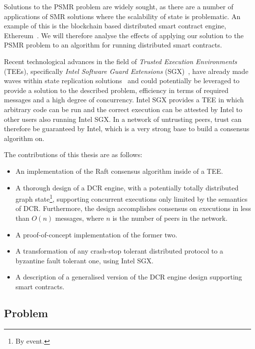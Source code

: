 \documentclass{article}
\begin{document}
	Solutions to the PSMR problem are widely sought, as there are a number of applications of SMR solutions where the scalability of state is problematic.
	An example of this is the blockchain based distributed smart contract engine, Ethereum~\cite{_ethereum_2018}.
	We will therefore analyse the effects of applying our solution to the PSMR problem to an algorithm for running distributed smart contracts.

	Recent technological advances in the field of \textit{Trusted Execution Environments} (TEEs), specifically \textit{Intel Software Guard Extensions} (SGX)~\cite{costan_intel_2016}, have already made waves within state replication solutions~\cite{kapitza_cheapbft_2012,veronese_efficient_2013,liu_scalable_2016} and could potentially be leveraged to provide a solution to the described problem, efficiency in terms of required messages and a high degree of concurrency.
	Intel SGX provides a TEE in which arbitrary code can be run and the correct execution can be attested by Intel to other users also running Intel SGX.
	In a network of untrusting peers, trust can therefore be guaranteed by Intel, which is a very strong base to build a consensus algorithm on.

	\noindent The contributions of this thesis are as follows:
	\begin{itemize}
		\item An implementation of the Raft consensus algorithm inside of a TEE.
		\item A thorough design of a DCR engine, with a potentially totally distributed graph state\footnote{By event.}, supporting concurrent executions only limited by the semantics of DCR.
		Furthermore, the design accomplishes consensus on executions in less than $O(n)$ messages, where $n$ is the number of peers in the network.
		\item A proof-of-concept implementation of the former two.
		\item A transformation of any crash-stop tolerant distributed protocol to a byzantine fault tolerant one, using Intel SGX.
		\item A description of a generalised version of the DCR engine design supporting smart contracts.
	\end{itemize}

	\subsection{Problem}
\end{document}
